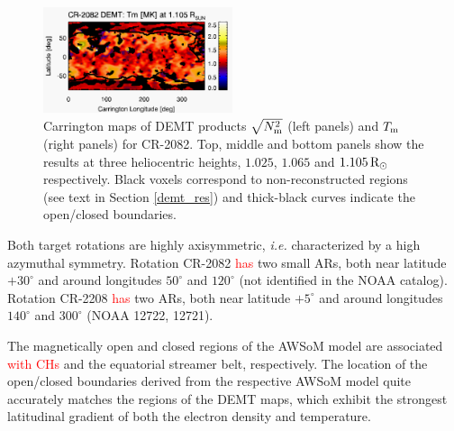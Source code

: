 \documentclass[namedreferences]{solarphysics}
\def\edit#1{\textcolor{Red}{#1}}
\newcommand{\mdeg}{^\circ}
\newcommand{\mrsun}{{\rm R_\odot}}
\newcommand{\Tm}{T_{\rm m}}
\newcommand{\Nsqm}{N^2_{{\rm m}}}
\newcommand{\sqravgN}{\sqrt{\Nsqm}}
\begin{document}
\begin{article}
\begin{figure}[h!]
\begin{center}
\includegraphics[width=0.495\textwidth]{figs/map_Tm_CR2082_DEMT-EUVI_behind_H1-L3523_r3d_1105_Rsun.pdf}
\caption{Carrington maps of DEMT {products $\sqravgN$} (left panels) and $\Tm$ (right panels) for CR-2082. Top, middle and bottom panels show the results at three heliocentric heights, $1.025$, $1.065$ and $1.105\,\mrsun$ respectively. Black voxels correspond to non-reconstructed regions (see text in Section \ref{demt_res}) and thick-black curves indicate the open/closed boundaries.}
\label{carmaps_demt_2082}
\end{center}
\end{figure}

{Both target rotations are highly axisymmetric, \textit{i.e.} characterized by a high azymuthal symmetry. Rotation CR-2082} \edit{has} two {small} ARs, both near latitude $+30\mdeg$ and {around longitudes} $50\mdeg$ and $120\mdeg$  {(not identified in the NOAA catalog)}. {Rotation CR-2208} \edit{has} two {ARs, both near latitude} $+5\mdeg$ and {around longitudes $140\mdeg$ and $300\mdeg$ {(NOAA 12722, 12721)}.} 

{The magnetically open and closed regions of the AWSoM model are associated \edit{with CHs} and the equatorial streamer belt, respectively. The {location of the} open/closed boundaries derived from the respective AWSoM model quite accurately matches {the regions of the DEMT maps, which exhibit the strongest latitudinal gradient of both the electron density and temperature.}}


\end{article}
\end{document}

